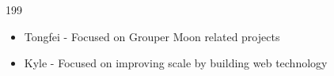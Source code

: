 \begin{frame}{199}
    \begin{itemize}
        \item Tongfei - Focused on Grouper Moon related projects
        \item Kyle - Focused on improving scale by building web technology
    \end{itemize}
\end{frame}





